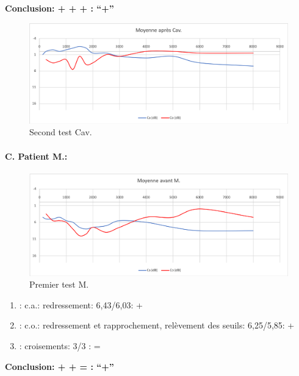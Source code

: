                 \textbf{  Conclusion:  + + +       : ``+''}

                \begin{figure}
\centering
\includegraphics[width=0.7\linewidth]{images/graphiques/cav_post.png}
\caption[Moyenne OG+OD]{Second test Cav.}
       
\label{groupecontroleimage1}
                \end{figure}



                
               \paragraph{ C. Patient M.:}



                \begin{figure}
\centering
\includegraphics[width=0.7\linewidth]{images/graphiques/m_pre.png}
\caption[Moyenne OG+OD]{Premier test M.}
       
\label{groupecontroleimage1}
\end{figure}

	\begin{enumerate}
 		
 		\item : c.a.: redressement:  6,43/6,03: +
                
 		\item : c.o.: redressement et rapprochement, relèvement des seuils: 6,25/5,85:  +
 		\item : croisements: 3/3 :  =
                  
                \end{enumerate}

                \textbf{  Conclusion:  +  +  =     : ``+''}

